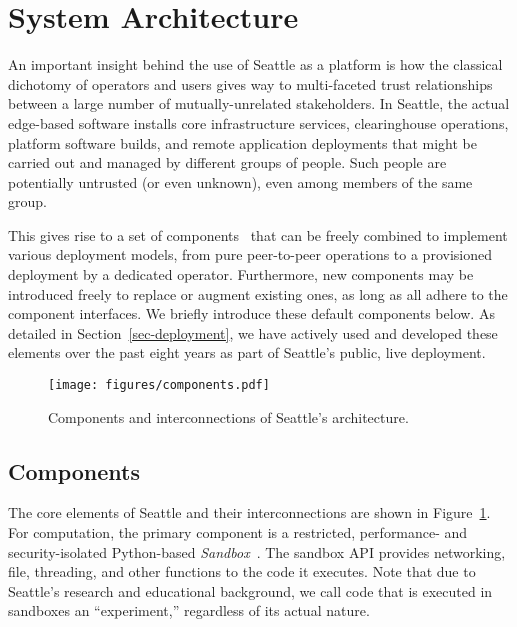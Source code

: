 \section{System Architecture}

An important insight behind the use of Seattle as a platform is how the classical
dichotomy of operators and users gives way to multi-faceted
trust relationships between a large number of mutually-unrelated
stakeholders.
In Seattle, the actual edge-based software installs core infrastructure
services, clearinghouse operations, platform software builds, and remote
application deployments that might be carried out and managed by different
groups of people. Such people are potentially untrusted (or even unknown),
even among members of the same group.

This gives rise to a set of components~\cite{Cappos2009}
that can be freely combined to implement various
deployment models, from pure peer-to-peer operations to a
provisioned deployment by a dedicated operator. Furthermore,
new components may be introduced freely to replace or augment
existing ones, as long as all adhere to the component interfaces.
We briefly introduce these default components below.
As detailed in Section~\ref{sec-deployment}, we have actively used
and developed these elements over the past eight years as part of
Seattle's public, live deployment.

\begin{figure}
  \centering
  \texttt{[image: figures/components.pdf]}
  \caption{Components and interconnections of Seattle's architecture.}
  \label{fig:arch}
\end{figure}


\subsection{Components}


The core elements of Seattle and their interconnections are shown in
Figure~\ref{fig:arch}.
For computation, the primary component is a restricted,
performance- and security-isolated Python-based
\textit{Sandbox}~\cite{RepySandbox,li2015fence}.
The sandbox \gls{API} provides
networking, file, threading, and other functions to
the code it executes. Note that
due to Seattle's research and educational background, we
call code that is executed in sandboxes an ``experiment,''
regardless of its actual nature.

